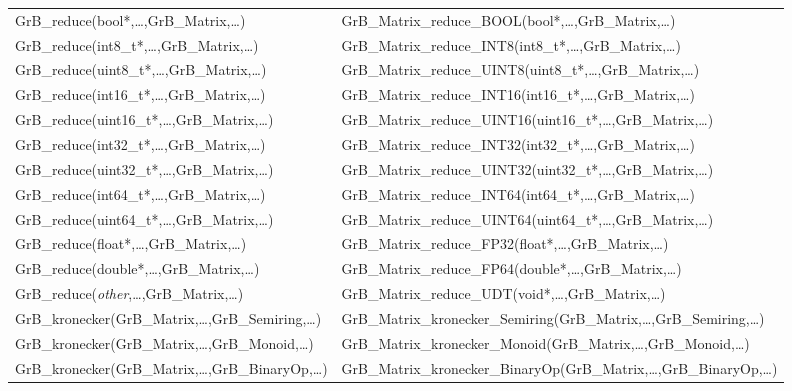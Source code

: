 \begin{table}[htb]
{\begin{tabular}{l|l}
{\sf GrB\_reduce(bool*,\ldots,GrB\_Matrix,\ldots)}		& {\sf GrB\_Matrix\_reduce\_BOOL(bool*,\ldots,GrB\_Matrix,\ldots)} \\
{\sf GrB\_reduce(int8\_t*,\ldots,GrB\_Matrix,\ldots)}		& {\sf GrB\_Matrix\_reduce\_INT8(int8\_t*,\ldots,GrB\_Matrix,\ldots)} \\
{\sf GrB\_reduce(uint8\_t*,\ldots,GrB\_Matrix,\ldots)}		& {\sf GrB\_Matrix\_reduce\_UINT8(uint8\_t*,\ldots,GrB\_Matrix,\ldots)} \\
{\sf GrB\_reduce(int16\_t*,\ldots,GrB\_Matrix,\ldots)}		& {\sf GrB\_Matrix\_reduce\_INT16(int16\_t*,\ldots,GrB\_Matrix,\ldots)} \\
{\sf GrB\_reduce(uint16\_t*,\ldots,GrB\_Matrix,\ldots)}		& {\sf GrB\_Matrix\_reduce\_UINT16(uint16\_t*,\ldots,GrB\_Matrix,\ldots)} \\
{\sf GrB\_reduce(int32\_t*,\ldots,GrB\_Matrix,\ldots)}		& {\sf GrB\_Matrix\_reduce\_INT32(int32\_t*,\ldots,GrB\_Matrix,\ldots)} \\
{\sf GrB\_reduce(uint32\_t*,\ldots,GrB\_Matrix,\ldots)}		& {\sf GrB\_Matrix\_reduce\_UINT32(uint32\_t*,\ldots,GrB\_Matrix,\ldots)} \\
{\sf GrB\_reduce(int64\_t*,\ldots,GrB\_Matrix,\ldots)}		& {\sf GrB\_Matrix\_reduce\_INT64(int64\_t*,\ldots,GrB\_Matrix,\ldots)} \\
{\sf GrB\_reduce(uint64\_t*,\ldots,GrB\_Matrix,\ldots)}		& {\sf GrB\_Matrix\_reduce\_UINT64(uint64\_t*,\ldots,GrB\_Matrix,\ldots)} \\
{\sf GrB\_reduce(float*,\ldots,GrB\_Matrix,\ldots)}		& {\sf GrB\_Matrix\_reduce\_FP32(float*,\ldots,GrB\_Matrix,\ldots)} \\
{\sf GrB\_reduce(double*,\ldots,GrB\_Matrix,\ldots)}		& {\sf GrB\_Matrix\_reduce\_FP64(double*,\ldots,GrB\_Matrix,\ldots)} \\
{\sf GrB\_reduce(\emph{other},\ldots,GrB\_Matrix,\ldots)}	& {\sf GrB\_Matrix\_reduce\_UDT(void*,\ldots,GrB\_Matrix,\ldots)} \\ \hline
{\sf GrB\_kronecker(GrB\_Matrix,\ldots,GrB\_Semiring,\ldots)} 	& {\sf GrB\_Matrix\_kronecker\_Semiring(GrB\_Matrix,\ldots,GrB\_Semiring,\ldots)} \\
{\sf GrB\_kronecker(GrB\_Matrix,\ldots,GrB\_Monoid,\ldots)} 	& {\sf GrB\_Matrix\_kronecker\_Monoid(GrB\_Matrix,\ldots,GrB\_Monoid,\ldots)} \\
{\sf GrB\_kronecker(GrB\_Matrix,\ldots,GrB\_BinaryOp,\ldots)} 	& {\sf GrB\_Matrix\_kronecker\_BinaryOp(GrB\_Matrix,\ldots,GrB\_BinaryOp,\ldots)} \\ \hline
\end{tabular}
}
\label{Tab:NonPolymorphic6}
\end{table}
